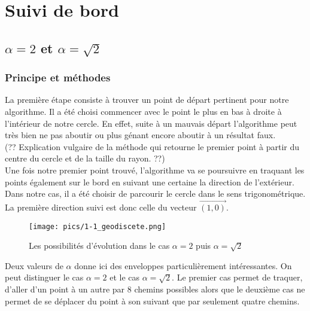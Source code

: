 %
%
%

\chapter{Suivi de bord}
\label{pt3-ch1-sb} %

\section{$\alpha = 2$ et $\alpha = \sqrt{2}$}
\label{pt3-ch1-sec:1}

\subsection{Principe et méthodes}
\label{pt3-ch1-sec:1-1}

La première étape consiste à trouver un point de départ pertinent pour notre algorithme. Il a été choisi commencer avec le point le plus en bas à droite à l'intérieur de notre cercle. En effet, suite à un mauvais départ l’algorithme peut très bien ne pas aboutir ou plus génant encore aboutir à un résultat faux. \\

(?? Explication vulgaire de la méthode qui retourne le premier point à partir du centre du cercle et de la taille du rayon. ??) \\

Une fois notre premier point trouvé, l'algorithme va se poursuivre en traquant les points également sur le bord en suivant une certaine la direction de l'extérieur. Dans notre cas, il a été choisir de parcourir le cercle dans le sens trigonométrique. La première direction suivi est donc celle du vecteur $\overrightarrow{(1,0)}$.\\

\begin{figure}[h!]
\centering
   \texttt{[image: pics/1-1\_geodiscete.png]}
\caption{Les possibilités d'évolution dans le cas $\alpha = 2$ puis $\alpha = \sqrt{2}$}
\end{figure}

Deux valeurs de $\alpha$ donne ici des enveloppes particulièrement intéressantes. On peut distinguer le cas $\alpha = 2$ et le cas $\alpha = \sqrt{2}$. Le premier cas permet de traquer, d'aller d'un point à un autre par 8 chemins possibles alors que le deuxième cas ne permet de se déplacer du point à son suivant que par seulement quatre chemins.\\


